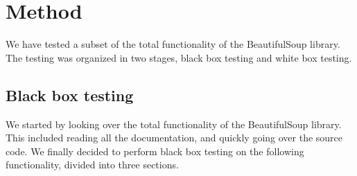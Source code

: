 \documentclass[10pt]{article}
\begin{document}
\section{Method}

We have tested a subset of the total functionality of the BeautifulSoup library. The testing was organized in two stages, black box testing and white box testing. 


\subsection{Black box testing}

We started by looking over the total functionality of the BeautifulSoup library. This included reading all the documentation, and quickly going over the source code. We finally decided to perform black box testing on the following functionality, divided into three sections.
\end{document}
